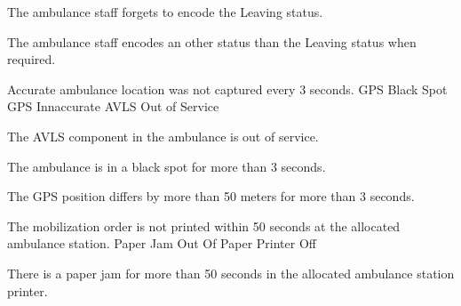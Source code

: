   \startkaosspec
  	 {The ambulance staff forgets to encode the Leaving status.}
  \stopkaosspec
  
  \startkaosspec
  	 {The ambulance staff encodes an other status than the Leaving status when required.}
  \stopkaosspec
  
  
    {}
  
  \startkaosspec
  	 {Accurate ambulance location was not captured every 3 seconds.}
  	 {GPS Black Spot}
  	 {GPS Innaccurate}
  	 {AVLS Out of Service}
  \stopkaosspec

  \startkaosspec
  	 {The AVLS component in the ambulance is out of service.}
  \stopkaosspec
  
  \startkaosspec
  	 {The ambulance is in a black spot for more than 3 seconds.}
  \stopkaosspec
  
  \startkaosspec
  	 {The GPS position differs by more than 50 meters for more than 3 seconds.}
  \stopkaosspec
  
  
    {}

  \startkaosspec
  	 {The mobilization order is not printed within 50 seconds at the allocated ambulance station.}
  	 {Paper Jam}
  	 {Out Of Paper}
  	 {Printer Off}
  \stopkaosspec
  
  \startkaosspec
  	 {There is a paper jam for more than 50 seconds in the allocated ambulance station printer.}
  \stopkaosspec
  
